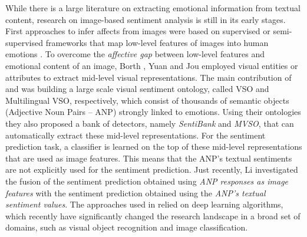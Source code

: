 While there is a large literature on extracting emotional information from textual content, research on image-based sentiment analysis is still in its early stages.
First approaches to infer affects from images were based on supervised or semi-supervised frameworks that map low-level features of images into human emotions \cite{Machajdik2010,Siersdorfer2010}. %
To overcome the \textit{affective gap} between low-level features and emotional content of an image, Borth \etal \cite{Borth2013:Large-scale}, Yuan \etal \cite{Yuan2013:Sentribute} and Jou \etal \cite{Jou2015:VisualAffect} employed visual entities or attributes to extract mid-level visual representations.
The main contribution of \cite{Borth2013:Large-scale} and \cite{Jou2015:VisualAffect} was building a large scale visual sentiment ontology, called VSO and Multilingual VSO, respectively, which consist of thousands of semantic objects (Adjective Noun Pairs -- ANP) strongly linked to emotions. Using their ontologies they also proposed  a bank of detectors, namely \textit{SentiBank} and \textit{MVSO}, that can automatically extract these mid-level representations.
For the sentiment prediction task, a classifier is learned on the top of
these mid-level representations that are used as image features.
This means that the ANP's textual sentiments are not explicitly used for the sentiment prediction. Just recently, Li \etal \cite{Li2017} investigated the fusion of the sentiment prediction obtained using \textit{ANP responses as image features} with the sentiment prediction obtained using the \textit{ANP's textual sentiment values}.
The approaches used in \cite{Jou2015:VisualAffect,Li2017} relied on deep learning algorithms, which recently have significantly changed the research landscape in a broad set of domains, such as visual object recognition and image classification. %
